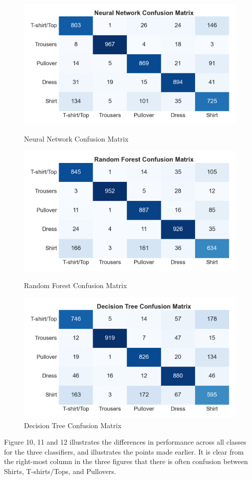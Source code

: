 \begin{figure}[H]
  \includegraphics[width=\linewidth]{figures_for_report/Neural Network Confusion Matrix}
  \caption{Neural Network Confusion Matrix}\label{fig:nn_cm}
\endminipage\hfill
{}
  \includegraphics[width=\linewidth]{figures_for_report/Random Forest Confusion Matrix}
  \caption{Random Forest Confusion Matrix}\label{fig:rf_cm}
\endminipage\hfill
    \centering
  \includegraphics[width=\linewidth]{figures_for_report/Decision Tree Confusion Matrix}
  \caption{Decision Tree Confusion Matrix}\label{fig:dt_cm}
\endminipage\hfill
\end{figure}\label{fig:cfm}

Figure 10, 11 and 12 illustrates the differences in performance across all classes for the three classifiers, and illustrates the points made earlier.
It is clear from the right-most column in the three figures that there is often confusion between Shirts, T-shirts/Tops, and Pullovers.